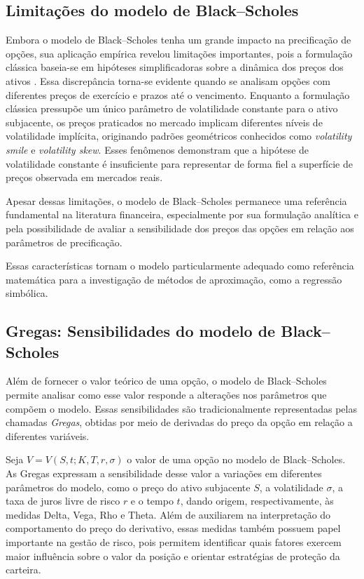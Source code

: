\subsection{Limitações do modelo de Black--Scholes}
Embora o modelo de Black--Scholes tenha um grande impacto na precificação de opções, sua aplicação empírica revelou limitações importantes, pois a formulação clássica baseia-se em hipóteses simplificadoras sobre a dinâmica dos preços dos ativos \cite{saporito2024}. Essa discrepância torna-se evidente quando se analisam opções com diferentes preços de exercício e prazos até o vencimento. Enquanto a formulação clássica pressupõe um único parâmetro de volatilidade constante para o ativo subjacente, os preços praticados no mercado implicam diferentes níveis de volatilidade implícita, originando padrões geométricos conhecidos como \textit{volatility smile} e \textit{volatility skew}. Esses fenômenos demonstram que a hipótese de volatilidade constante é insuficiente para representar de forma fiel a superfície de preços observada em mercados reais.

Apesar dessas limitações, o modelo de
Black--Scholes permanece uma referência
fundamental na literatura financeira,
especialmente por sua formulação analítica
e pela possibilidade de avaliar a sensibilidade
dos preços das opções em relação aos parâmetros
de precificação.

Essas características tornam o modelo
particularmente adequado como referência
matemática para a investigação de métodos
de aproximação, como a regressão simbólica.


\subsection{Gregas: Sensibilidades do modelo de Black--Scholes}

Além de fornecer o valor teórico de uma opção, o modelo de Black--Scholes
permite analisar como esse valor responde a alterações nos parâmetros que
compõem o modelo. Essas sensibilidades são tradicionalmente representadas
pelas chamadas \textit{Gregas}, obtidas por meio de derivadas do preço da
opção em relação a diferentes variáveis. \cite{hull2022}

Seja $V = V(S,t;K,T,r,\sigma)$ o valor de uma opção no modelo de
Black--Scholes. As Gregas expressam a sensibilidade desse valor a
variações em diferentes parâmetros do modelo, como o preço do ativo
subjacente $S$, a volatilidade $\sigma$, a taxa de juros livre de risco $r$
e o tempo $t$, dando origem, respectivamente, às medidas Delta, Vega, Rho
e Theta. Além de auxiliarem na interpretação do comportamento do preço do derivativo,
essas medidas também possuem papel importante na gestão de risco, pois
permitem identificar quais fatores exercem maior influência sobre o valor da
posição e orientar estratégias de proteção da carteira.


